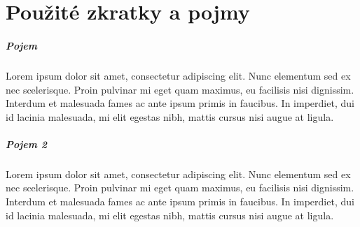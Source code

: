 \chapter*{Použité zkratky a pojmy}

\paragraph{Pojem}

Lorem ipsum dolor sit amet, consectetur adipiscing elit. Nunc elementum sed ex nec scelerisque. Proin pulvinar mi eget quam maximus, eu facilisis nisi dignissim. Interdum et malesuada fames ac ante ipsum primis in faucibus. In imperdiet, dui id lacinia malesuada, mi elit egestas nibh, mattis cursus nisi augue at ligula.


\paragraph{Pojem 2}

Lorem ipsum dolor sit amet, consectetur adipiscing elit. Nunc elementum sed ex nec scelerisque. Proin pulvinar mi eget quam maximus, eu facilisis nisi dignissim. Interdum et malesuada fames ac ante ipsum primis in faucibus. In imperdiet, dui id lacinia malesuada, mi elit egestas nibh, mattis cursus nisi augue at ligula.